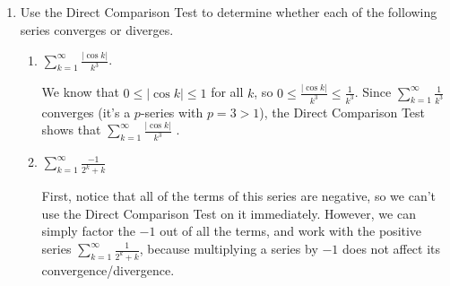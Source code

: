 \documentclass[main]{subfiles}
\begin{document}
\begin{enumerate}
\pspace{\newpage}

\begin{framed}
\centerline{\textbf{The Direct Comparison Test}}
Let $\displaystyle \sum a_k$ and $\displaystyle \sum b_k$ be two series such that 
$$0\leq a_k \leq b_k$$ for all $k$, \textit{eventually}. Then:
\begin{itemize}
\item If $\displaystyle \sum b_k$ \uline{converges}, then $\displaystyle \sum a_k$ \uline{converges} as well. 
\item If $\displaystyle \sum a_k$ \uline{diverges}, then $\displaystyle \sum b_k$ \uline{diverges} as well. 
\end{itemize}

\textcolor{red}{\uline{Warning}: If $\displaystyle \sum a_k$ \textit{converges}, we cannot say anything about the convergence of $\displaystyle \sum b_k$! Similarly, if $\displaystyle \sum b_k$ \textit{diverges}, we cannot say anything about the convergence of $\displaystyle \sum a_k$!}
\end{framed}



 \item  Use the Direct Comparison Test to determine whether each of the following series converges or diverges.
 
    \probonly{}
    \begin{enumerate}
     \item
      \begin{problem}[1in]
      $\displaystyle \sum_{k=1}^\infty \frac{|\cos k|}{k^3}$.
      \end{problem}

      \begin{solution}
      We know that $0 \leq |\cos k| \leq 1$ for all $k$, so $\displaystyle
      0 \leq \frac{|\cos k|}{k^3} \leq \frac{1}{k^3}$.  Since
      $\displaystyle \sum_{k=1}^\infty \frac{1}{k^3}$ converges (it's a
      $p$-series with $p = 3>1$), the
      Direct Comparison Test shows that $\displaystyle \sum_{k=1}^\infty
      \frac{|\cos k|}{k^3}$ .
      \end{solution}
      
       \item 
    \begin{problem}[1in]
    $\displaystyle \sum_{k=1}^\infty \frac{-1}{2^k + k}$
    \end{problem}

    \begin{solution}
    First, notice that all of the terms of this series are negative, so we can't use the Direct Comparison Test on it immediately. However, we can simply factor the $-1$ out of all the terms, and work with the positive series $\displaystyle \sum_{k=1}^\infty \frac{1}{2^k + k}$, because multiplying a series by $-1$ does not affect its convergence/divergence.
    

\end{solution}
\end{enumerate}
\end{enumerate}
\end{document}
